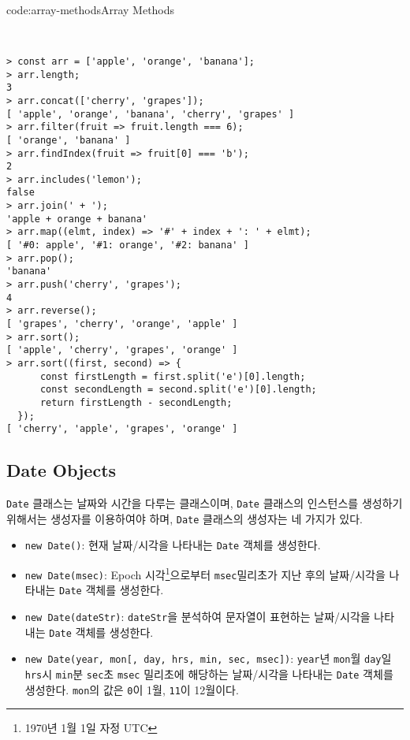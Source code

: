 \begin{codeenv}{code:array-methods}{Array Methods}\begin{verbatim}


> const arr = ['apple', 'orange', 'banana'];
> arr.length;
3
> arr.concat(['cherry', 'grapes']);
[ 'apple', 'orange', 'banana', 'cherry', 'grapes' ]
> arr.filter(fruit => fruit.length === 6);
[ 'orange', 'banana' ]
> arr.findIndex(fruit => fruit[0] === 'b');
2
> arr.includes('lemon');
false
> arr.join(' + ');
'apple + orange + banana'
> arr.map((elmt, index) => '#' + index + ': ' + elmt);
[ '#0: apple', '#1: orange', '#2: banana' ]
> arr.pop();
'banana'
> arr.push('cherry', 'grapes');
4
> arr.reverse();
[ 'grapes', 'cherry', 'orange', 'apple' ]
> arr.sort();
[ 'apple', 'cherry', 'grapes', 'orange' ]
> arr.sort((first, second) => {
      const firstLength = first.split('e')[0].length;
      const secondLength = second.split('e')[0].length;
      return firstLength - secondLength;
  });
[ 'cherry', 'apple', 'grapes', 'orange' ]
\end{verbatim}
\end{codeenv}
\pagebreak

\subsection*{Date Objects}

\texttt{Date} 클래스는 날짜와 시간을 다루는 클래스이며, \texttt{Date} 클래스의 인스턴스를 생성하기 위해서는 생성자를 이용하여야 하며, \texttt{Date} 클래스의 생성자는 네 가지가 있다.

\begin{itemize}
    \item \texttt{new Date()}: 현재 날짜/시각을 나타내는 \texttt{Date} 객체를 생성한다.
    \item \texttt{new Date(msec)}: Epoch 시각\footnote{1970년 1월 1일 자정 UTC}으로부터 \texttt{msec}밀리초가 지난 후의 날짜/시각을 나타내는 \texttt{Date} 객체를 생성한다.
    \item \texttt{new Date(dateStr)}: \texttt{dateStr}을 분석하여 문자열이 표현하는 날짜/시각을 나타내는 \texttt{Date} 객체를 생성한다.
    \item \texttt{new Date(year, mon[, day, hrs, min, sec, msec])}: \texttt{year}년 \texttt{mon}월 \texttt{day}일 \texttt{hrs}시 \texttt{min}분 \texttt{sec}초 \texttt{msec} 밀리초에 해당하는 날짜/시각을 나타내는 \texttt{Date} 객체를 생성한다. \texttt{mon}의 값은 \texttt{0}이 1월, \texttt{11}이 12월이다.
\end{itemize}

